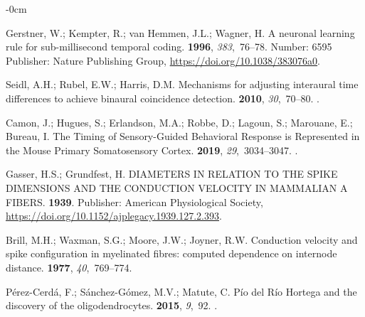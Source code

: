 \documentclass[brainsci, %
               review,submit,pdftex,moreauthors
               ]{Definitions/mdpi}
\begin{document}
\begin{adjustwidth}{-\extralength}{0cm}
\begin{thebibliography}{999}
  Gerstner, W.; Kempter, R.; van Hemmen, J.L.; Wagner, H.
  \newblock A neuronal learning rule for sub-millisecond temporal coding.
   {\bf 1996}, {\em 383},~76--78.
  \newblock Number: 6595 Publisher: Nature Publishing Group,
    {\url{https://doi.org/10.1038/383076a0}}.
  
  Seidl, A.H.; Rubel, E.W.; Harris, D.M.
  \newblock Mechanisms for adjusting interaural time differences to achieve
    binaural coincidence detection.
   {\bf 2010}, {\em 30},~70--80.
  .
  
  Camon, J.; Hugues, S.; Erlandson, M.A.; Robbe, D.; Lagoun, S.; Marouane, E.;
    Bureau, I.
  \newblock The {Timing} of {Sensory}-{Guided} {Behavioral} {Response} is
    {Represented} in the {Mouse} {Primary} {Somatosensory} {Cortex}.
   {\bf 2019}, {\em 29},~3034--3047.
  .
  
  Gasser, H.S.; Grundfest, H.
   {DIAMETERS} {IN} {RELATION} {TO} {THE} {SPIKE} {DIMENSIONS}
    {AND} {THE} {CONDUCTION} {VELOCITY} {IN} {MAMMALIAN} {A} {FIBERS}.
   {\bf 1939}.
  \newblock Publisher: American Physiological Society,
    {\url{https://doi.org/10.1152/ajplegacy.1939.127.2.393}}.
  
  Brill, M.H.; Waxman, S.G.; Moore, J.W.; Joyner, R.W.
  \newblock Conduction velocity and spike configuration in myelinated fibres:
    computed dependence on internode distance.
   {\bf 1977},
    {\em 40},~769--774.
  
  Pérez-Cerdá, F.; Sánchez-Gómez, M.V.; Matute, C.
  \newblock Pío del {Río} {Hortega} and the discovery of the oligodendrocytes.
   {\bf 2015}, {\em 9},~92.
  .
  

\end{thebibliography}
\end{adjustwidth}
\end{document}
